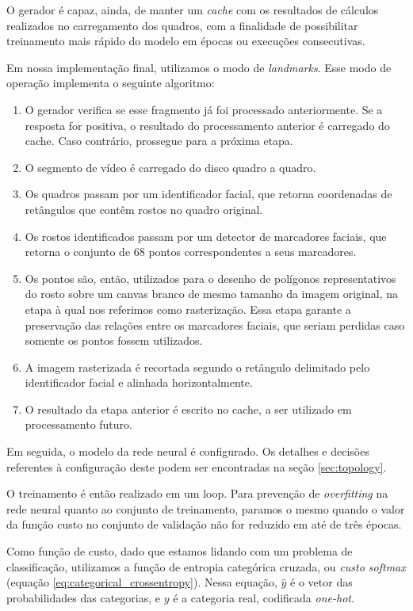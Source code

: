 O gerador é capaz, ainda, de manter um \textit{cache} com os resultados de cálculos realizados no carregamento dos quadros, com a finalidade de possibilitar treinamento mais rápido do modelo em épocas ou execuções consecutivas.

Em nossa implementação final, utilizamos o modo de \textit{landmarks}. Esse modo de operação implementa o seguinte algoritmo:

\begin{enumerate}
    \item O gerador verifica se esse fragmento já foi processado anteriormente. Se a resposta for positiva, o resultado do processamento anterior é carregado do cache. Caso contrário, prossegue para a próxima etapa.
    \item O segmento de vídeo é carregado do disco quadro a quadro. 
    \item Os quadros passam por um identificador facial, que retorna coordenadas de retângulos que contêm rostos no quadro original. 
    \item Os rostos identificados passam por um detector de marcadores faciais, que retorna o conjunto de 68 pontos correspondentes a seus marcadores. 
    \item Os pontos são, então, utilizados para o desenho de polígonos representativos do rosto sobre um canvas branco de mesmo tamanho da imagem original, na etapa à qual nos referimos como rasterização. Essa etapa garante a preservação das relações entre os marcadores faciais, que seriam perdidas caso somente os pontos fossem utilizados. 
    \item A imagem rasterizada é recortada segundo o retângulo delimitado pelo identificador facial e alinhada horizontalmente.
    \item O resultado da etapa anterior é escrito no cache, a ser utilizado em processamento futuro.
\end{enumerate}

Em seguida, o modelo da rede neural é configurado. Os detalhes e decisões referentes à configuração deste podem ser encontradas na seção \ref{sec:topology}. 

O treinamento é então realizado em um loop. Para prevenção de \textit{overfitting} na rede neural quanto ao conjunto de treinamento, paramos o mesmo quando o valor da função custo no conjunto de validação não for reduzido em até de três épocas.

Como função de custo, dado que estamos lidando com um problema de classificação, utilizamos a função de entropia categórica cruzada, ou \textit{custo softmax} (equação \ref{eq:categorical_crossentropy}). Nessa equação, $\hat{y}$ é o vetor das probabilidades das categorias, e $y$ é a categoria real, codificada \textit{one-hot}.

